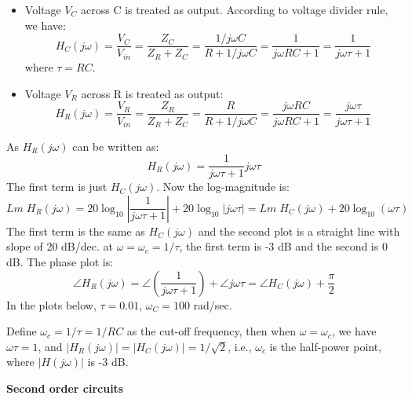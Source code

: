 \documentclass{article}
\begin{document}
\begin{itemize}
\item Voltage $V_C$ across C is treated as output. According to voltage
  divider rule, we have:
\begin{equation}  H_C(j\omega)=\frac{V_C}{V_{in}}=\frac{Z_C}{Z_R+Z_C}
    =\frac{1/j\omega C}{R+1/j\omega C} 
    =\frac{1}{j\omega RC+1}=\frac{1}{j\omega \tau+1} \end{equation}
    where $\tau=RC$.
\item Voltage $V_R$ across R is treated as output:
  \begin{equation} H_R(j\omega)=\frac{V_R}{V_{in}}=\frac{Z_R}{Z_R+Z_C}
    =\frac{R}{R+1/j\omega C}=\frac{j\omega RC}{j\omega RC+1} 
    =\frac{j\omega \tau}{j\omega \tau+1} \end{equation}
\end{itemize}
As $H_R(j\omega)$ can be written as:
\begin{equation} H_R(j\omega)= \frac{1}{j\omega \tau+1} j\omega \tau  \end{equation}
The first term is just $H_C(j\omega)$. Now the log-magnitude is:
\begin{equation} Lm\;H_R(j\omega)
=20\log_{10} \left| \frac{1}{j\omega \tau+1}\right|+20\log_{10} \left| j\omega \tau \right| 
=Lm\; H_C(j\omega) +20\log_{10} (\omega\tau) \end{equation}
The first term is the same as $H_C(j\omega)$ and the second plot is a straight line
with slope of 20 dB/dec. at $\omega=\omega_c=1/\tau$, the first term is -3 dB and the  
second is 0 dB.  The phase plot is:
\begin{equation} \angle H_R(j\omega)=\angle \left(\frac{1}{j\omega \tau+1}\right)+\angle j\omega \tau  
=\angle H_C(j\omega)+\frac{\pi}{2} \end{equation}
In the plots below, $\tau=0.01$, $\omega_C=100$ rad/sec.


Define $\omega_c=1/\tau=1/RC$ as the cut-off frequency, then when $\omega=\omega_c$, 
we have $\omega\tau=1$, and $|H_R(j\omega)|=|H_C(j\omega)|=1/\sqrt{2}$, i.e., $\omega_c$
is the half-power point, where $|H(j\omega)|$ is -3 dB.

{\bf Second order circuits}

\end{document}
